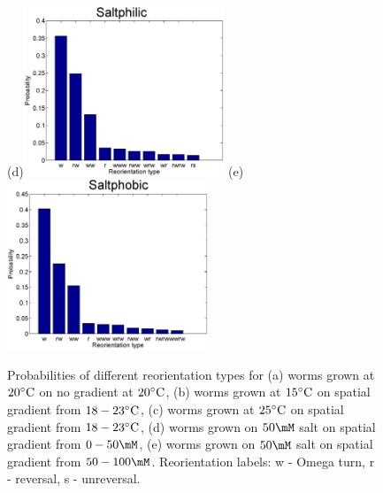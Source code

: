 \documentclass[12pt]{article}
\begin{document}
\begin{figure}
\begin{center}
    (d)\includegraphics[width=6cm]{ReoTypeProb-lowsalt.eps}
    (e)\includegraphics[width=6cm]{ReoTypeProb-highsalt.eps}
  \end{center}
  \caption{Probabilities of different reorientation types for (a) worms grown at $20^\circ\mathrm{C}$ on no gradient at $20^\circ\mathrm{C}$, (b) worms grown at $15^\circ\mathrm{C}$ on spatial gradient from $18-23^\circ\mathrm{C}$, (c)  worms grown at $25^\circ\mathrm{C}$ on spatial gradient from $18-23^\circ\mathrm{C}$, (d)  worms grown on $50\mM$ salt on spatial gradient from $0-50\mM$, (e)  worms grown on $50\mM$ salt on spatial gradient from $50-100\mM$.  Reorientation labels: w - Omega turn, r - reversal, s - unreversal. }\label{fig:typeprob}
\end{figure}
\end{document}
